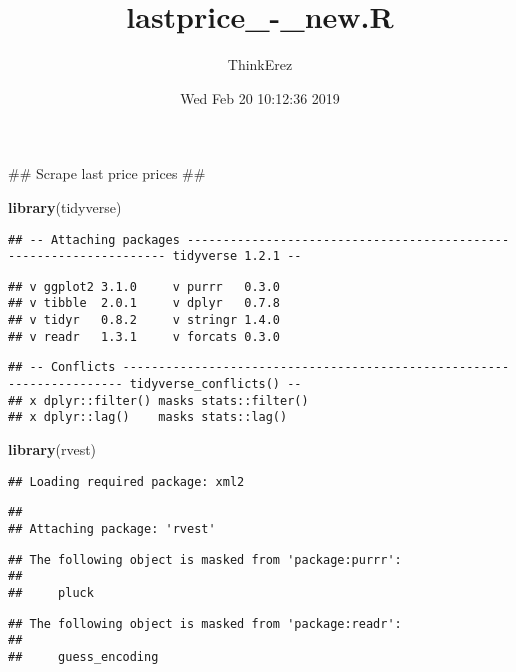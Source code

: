 \documentclass[]{article}
\title{lastprice\_-\_new.R}
\author{ThinkErez}
\date{Wed Feb 20 10:12:36 2019}
\newenvironment{Shaded}{\begin{snugshade}}{\end{snugshade}}
\newcommand{\KeywordTok}[1]{\textcolor[rgb]{0.13,0.29,0.53}{\textbf{#1}}}
\newcommand{\NormalTok}[1]{#1}
\begin{document}
\maketitle

\begin{Shaded}
\begin{Highlighting}[]
\NormalTok{## Scrape last price prices ##}

\KeywordTok{library}\NormalTok{(tidyverse)  }
\end{Highlighting}
\end{Shaded}

\begin{verbatim}
## -- Attaching packages ------------------------------------------------------------------- tidyverse 1.2.1 --
\end{verbatim}

\begin{verbatim}
## v ggplot2 3.1.0     v purrr   0.3.0
## v tibble  2.0.1     v dplyr   0.7.8
## v tidyr   0.8.2     v stringr 1.4.0
## v readr   1.3.1     v forcats 0.3.0
\end{verbatim}

\begin{verbatim}
## -- Conflicts ---------------------------------------------------------------------- tidyverse_conflicts() --
## x dplyr::filter() masks stats::filter()
## x dplyr::lag()    masks stats::lag()
\end{verbatim}

\begin{Shaded}
\begin{Highlighting}[]
\KeywordTok{library}\NormalTok{(rvest)    }
\end{Highlighting}
\end{Shaded}

\begin{verbatim}
## Loading required package: xml2
\end{verbatim}

\begin{verbatim}
## 
## Attaching package: 'rvest'
\end{verbatim}

\begin{verbatim}
## The following object is masked from 'package:purrr':
## 
##     pluck
\end{verbatim}

\begin{verbatim}
## The following object is masked from 'package:readr':
## 
##     guess_encoding
\end{verbatim}
\end{document}
